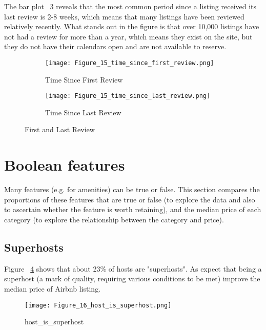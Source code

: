 The bar plot ~\ref{fig:time_since_last_review} reveals that the most
common period since a listing received its last review is 2-8 weeks, which means
that many listings have been reviewed relatively recently.  What stands out in
the figure is that over 10,000 listings have not had a review for more than a
year, which means they exist on the site, but they do not have their calendars
open and are not available to reserve.

\begin{figure}[H]
    \centering
    \begin{subfigure}[b]{0.48\textwidth}
        \centering
        \caption{Time Since First Review}
        \texttt{[image: Figure\_15\_time\_since\_first\_review.png]}
        \label{fig:time_since_first_review}
    \end{subfigure}
    \begin{subfigure}[b]{0.48\textwidth}
        \centering
        \caption{Time Since Last Review}
        \texttt{[image: Figure\_15\_time\_since\_last\_review.png]}
        \label{fig:time_since_last_review}
    \end{subfigure}
    \caption{First and Last Review}
\end{figure}

\section{Boolean features}
\label{sec:boolean_features}

Many features (e.g. for amenities) can be true or false. This section compares
the proportions of these features that are true or false (to explore the data
and also to ascertain whether the feature is worth retaining), and the median
price of each category (to explore the relationship between the category and
price).

\subsection{Superhosts}

Figure ~\ref{fig:host_is_superhost} shows that about 23\% of hosts are "superhosts". As expect that being a superhost (a
mark of quality, requiring various conditions to be met)  improve the median
price of Airbnb listing.

\begin{figure}[H]\centering
    \caption{host\_is\_superhost}
    \texttt{[image: Figure\_16\_host\_is\_superhost.png]}
    \label{fig:host_is_superhost}
\end{figure}

